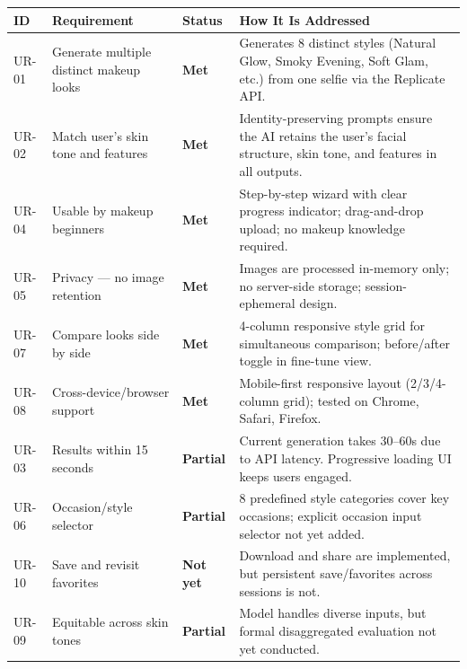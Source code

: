 \documentclass[10pt, letterpaper]{article}
\begin{document}
\small
\begin{tabularx}{\textwidth}{p{0.9cm} p{3.5cm} p{1.1cm} X}
\toprule
\textbf{ID} & \textbf{Requirement} & \textbf{Status} & \textbf{How It Is Addressed} \\
\midrule
UR-01 & Generate multiple distinct makeup looks & \textcolor{green!50!black}{\textbf{Met}} & Generates 8 distinct styles (Natural Glow, Smoky Evening, Soft Glam, etc.) from one selfie via the Replicate API. \\
\addlinespace
UR-02 & Match user's skin tone and features & \textcolor{green!50!black}{\textbf{Met}} & Identity-preserving prompts ensure the AI retains the user's facial structure, skin tone, and features in all outputs. \\
\addlinespace
UR-04 & Usable by makeup beginners & \textcolor{green!50!black}{\textbf{Met}} & Step-by-step wizard with clear progress indicator; drag-and-drop upload; no makeup knowledge required. \\
\addlinespace
UR-05 & Privacy --- no image retention & \textcolor{green!50!black}{\textbf{Met}} & Images are processed in-memory only; no server-side storage; session-ephemeral design. \\
\addlinespace
UR-07 & Compare looks side by side & \textcolor{green!50!black}{\textbf{Met}} & 4-column responsive style grid for simultaneous comparison; before/after toggle in fine-tune view. \\
\addlinespace
UR-08 & Cross-device/browser support & \textcolor{green!50!black}{\textbf{Met}} & Mobile-first responsive layout (2/3/4-column grid); tested on Chrome, Safari, Firefox. \\
\addlinespace
UR-03 & Results within 15 seconds & \textcolor{orange!80!black}{\textbf{Partial}} & Current generation takes 30--60s due to API latency. Progressive loading UI keeps users engaged. \\
\addlinespace
UR-06 & Occasion/style selector & \textcolor{orange!80!black}{\textbf{Partial}} & 8 predefined style categories cover key occasions; explicit occasion input selector not yet added. \\
\addlinespace
UR-10 & Save and revisit favorites & \textcolor{red!70!black}{\textbf{Not yet}} & Download and share are implemented, but persistent save/favorites across sessions is not. \\
\addlinespace
UR-09 & Equitable across skin tones & \textcolor{orange!80!black}{\textbf{Partial}} & Model handles diverse inputs, but formal disaggregated evaluation not yet conducted. \\
\bottomrule
\end{tabularx}
\end{document}
